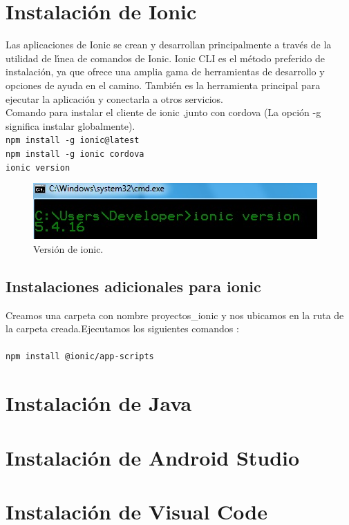 \section{Instalaci\'on de Ionic}
Las aplicaciones de Ionic se crean y desarrollan principalmente a trav\'es de la utilidad de l\'\i{}nea  de comandos de Ionic. Ionic CLI es el m\'etodo preferido de instalaci\'on, ya que ofrece una amplia gama de herramientas de desarrollo y opciones de ayuda en el camino. Tambi\'en es la herramienta principal para ejecutar la aplicaci\'on y conectarla a otros servicios.\\
Comando para instalar el cliente de ionic ,junto con cordova  (La opci\'on -g significa instalar globalmente).\\
\texttt{npm install -g ionic@latest}\\
\texttt{npm install -g ionic cordova}\\
\texttt{ionic version}
\begin{figure}[H] %
	\centering %
	\includegraphics[scale=0.8]{figuras/fig_1_5.jpg}
	\caption{Versi\'on de ionic.}
\end{figure}

\subsection{Instalaciones adicionales para ionic}
Creamos una carpeta con nombre proyectos\_ionic y nos ubicamos en la ruta de la carpeta creada.Ejecutamos los siguientes comandos :\\\\
\texttt{npm install @ionic/app-scripts}

\section{Instalaci\'on de Java}
\section{Instalaci\'on de Android Studio}
\section{Instalaci\'on de Visual Code}


